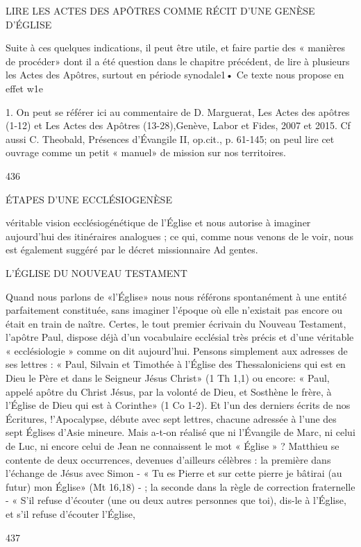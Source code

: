 LIRE LES ACTES DES APÔTRES
COMME RÉCIT D'UNE GENÈSE D'ÉGLISE

Suite à ces quelques indications, il peut être utile, et faire partie des « manières de procéder» dont il a été question dans le chapitre précédent, de lire à plusieurs les Actes des Apôtres, surtout en période synodale1• Ce texte nous propose en effet w1e

1.	On peut se référer ici au commentaire de D. Marguerat, Les Actes des apôtres (1-12) et Les Actes des Apôtres (13-28),Genève, Labor et Fides, 2007 et 2015. Cf aussi C. Theobald, Présences d'Évangile II, op.cit., p. 61-145; on peul lire cet ouvrage comme un petit « manuel» de mission sur nos territoires.

436
 
ÉTAPES D'UNE ECCLÉSIOGENÈSE

véritable vision ecclésiogénétique de l'Église et nous autorise à imaginer aujourd'hui des itinéraires analogues ; ce qui, comme nous venons de le voir, nous est également suggéré par le décret missionnaire Ad gentes.

L'ÉGLISE DU NOUVEAU TESTAMENT

Quand nous parlons de «l'Église» nous nous référons spontanément à une entité parfaitement constituée, sans imaginer l'époque où elle n'existait pas encore ou était en train de naître. Certes, le tout premier écrivain du Nouveau Testament, l'apôtre Paul, dispose déjà d'un vocabulaire ecclésial très précis et d'une véritable « ecclésiologie » comme on dit aujourd'hui. Pensons simplement aux adresses de ses lettres : « Paul, Silvain et Timothée à l'Église des Thessaloniciens qui est en Dieu le Père et dans le Seigneur Jésus Christ» (1 Th 1,1) ou encore: « Paul, appelé apôtre du Christ Jésus, par la volonté de Dieu, et Sosthène le frère, à l'Église de Dieu qui est à Corinthe» (1 Co 1-2). Et l'un des derniers écrits de nos Écritures, !'Apocalypse, débute avec sept lettres, chacune adressée à l'une des sept Églises d'Asie mineure.
Mais a-t-on réalisé que ni l'Évangile de Marc, ni celui de Luc, ni encore celui de Jean ne connaissent le mot « Église » ? Matthieu se contente de deux occurrences, devenues d'ailleurs célèbres : la première dans l'échange de Jésus avec Simon
- « Tu es Pierre et sur cette pierre je bâtirai (au futur) mon Église» (Mt 16,18) - ; la seconde dans la règle de correction fraternelle - « S'il refuse d'écouter (une ou deux autres personnes que toi), dis-le à l'Église, et s'il refuse d'écouter l'Église,

437
 
